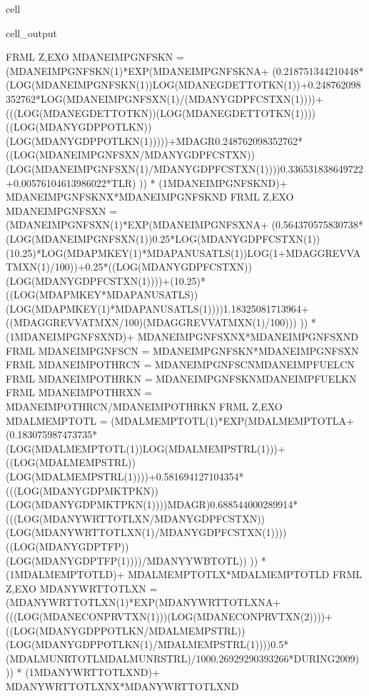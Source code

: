 \documentclass[letterpaper,10pt,english]{jupyterBook}
\begin{document}
\begin{sphinxuseclass}{cell}
\begin{sphinxVerbatimOutput}
\begin{sphinxuseclass}{cell_output}
\begin{sphinxVerbatim}[commandchars=\\\{\}]
FRML \PYGZlt{}Z,EXO\PYGZgt{} MDANEIMPGNFSKN = (MDANEIMPGNFSKN(\PYGZhy{}1)*EXP(MDANEIMPGNFSKN\PYGZus{}A+ (\PYGZhy{}0.218751344210448*(LOG(MDANEIMPGNFSKN(\PYGZhy{}1))\PYGZhy{}LOG(MDANEGDETTOTKN(\PYGZhy{}1))+0.248762098352762*LOG(MDANEIMPGNFSXN(\PYGZhy{}1)/(MDANYGDPFCSTXN(\PYGZhy{}1))))+(((LOG(MDANEGDETTOTKN))\PYGZhy{}(LOG(MDANEGDETTOTKN(\PYGZhy{}1))))\PYGZhy{}((LOG(MDANYGDPPOTLKN))\PYGZhy{}(LOG(MDANYGDPPOTLKN(\PYGZhy{}1)))))+MDAGR\PYGZhy{}0.248762098352762*((LOG(MDANEIMPGNFSXN/MDANYGDPFCSTXN))\PYGZhy{}(LOG(MDANEIMPGNFSXN(\PYGZhy{}1)/MDANYGDPFCSTXN(\PYGZhy{}1))))\PYGZhy{}0.336531838649722+0.00576104613986022*T\PYGZus{}LR) )) * (1\PYGZhy{}MDANEIMPGNFSKN\PYGZus{}D)+ MDANEIMPGNFSKN\PYGZus{}X*MDANEIMPGNFSKN\PYGZus{}D  \PYGZdl{}
FRML \PYGZlt{}Z,EXO\PYGZgt{} MDANEIMPGNFSXN = (MDANEIMPGNFSXN(\PYGZhy{}1)*EXP(MDANEIMPGNFSXN\PYGZus{}A+ (\PYGZhy{}0.564370575830738*(LOG(MDANEIMPGNFSXN(\PYGZhy{}1))\PYGZhy{}0.25*LOG(MDANYGDPFCSTXN(\PYGZhy{}1))\PYGZhy{}(1\PYGZhy{}0.25)*LOG(MDAPMKEY(\PYGZhy{}1)*MDAPANUSATLS(\PYGZhy{}1))\PYGZhy{}LOG(1+MDAGGREVVATMXN(\PYGZhy{}1)/100))+0.25*((LOG(MDANYGDPFCSTXN))\PYGZhy{}(LOG(MDANYGDPFCSTXN(\PYGZhy{}1))))+(1\PYGZhy{}0.25)*((LOG(MDAPMKEY*MDAPANUSATLS))\PYGZhy{}(LOG(MDAPMKEY(\PYGZhy{}1)*MDAPANUSATLS(\PYGZhy{}1))))\PYGZhy{}1.18325081713964+((MDAGGREVVATMXN/100)\PYGZhy{}(MDAGGREVVATMXN(\PYGZhy{}1)/100))) )) * (1\PYGZhy{}MDANEIMPGNFSXN\PYGZus{}D)+ MDANEIMPGNFSXN\PYGZus{}X*MDANEIMPGNFSXN\PYGZus{}D  \PYGZdl{}
FRML  \PYGZlt{}\PYGZgt{} MDANEIMPGNFSCN = MDANEIMPGNFSKN*MDANEIMPGNFSXN \PYGZdl{}
FRML  \PYGZlt{}\PYGZgt{} MDANEIMPOTHRCN = MDANEIMPGNFSCN\PYGZhy{}MDANEIMPFUELCN \PYGZdl{}
FRML  \PYGZlt{}\PYGZgt{} MDANEIMPOTHRKN = MDANEIMPGNFSKN\PYGZhy{}MDANEIMPFUELKN \PYGZdl{}
FRML  \PYGZlt{}\PYGZgt{} MDANEIMPOTHRXN = MDANEIMPOTHRCN/MDANEIMPOTHRKN \PYGZdl{}
FRML \PYGZlt{}Z,EXO\PYGZgt{} MDALMEMPTOTL = (MDALMEMPTOTL(\PYGZhy{}1)*EXP(MDALMEMPTOTL\PYGZus{}A+ (\PYGZhy{}0.183075987473735*(LOG(MDALMEMPTOTL(\PYGZhy{}1))\PYGZhy{}LOG(MDALMEMPSTRL(\PYGZhy{}1)))+((LOG(MDALMEMPSTRL))\PYGZhy{}(LOG(MDALMEMPSTRL(\PYGZhy{}1))))+0.581694127104354*(((LOG(MDANYGDPMKTPKN))\PYGZhy{}(LOG(MDANYGDPMKTPKN(\PYGZhy{}1))))\PYGZhy{}MDAGR)\PYGZhy{}0.688544000289914*(((LOG(MDANYWRTTOTLXN/MDANYGDPFCSTXN))\PYGZhy{}(LOG(MDANYWRTTOTLXN(\PYGZhy{}1)/MDANYGDPFCSTXN(\PYGZhy{}1))))\PYGZhy{}((LOG(MDANYGDPTFP))\PYGZhy{}(LOG(MDANYGDPTFP(\PYGZhy{}1))))/MDANYYWBTOTL\PYGZus{})) )) * (1\PYGZhy{}MDALMEMPTOTL\PYGZus{}D)+ MDALMEMPTOTL\PYGZus{}X*MDALMEMPTOTL\PYGZus{}D  \PYGZdl{}
FRML \PYGZlt{}Z,EXO\PYGZgt{} MDANYWRTTOTLXN = (MDANYWRTTOTLXN(\PYGZhy{}1)*EXP(MDANYWRTTOTLXN\PYGZus{}A+ (((LOG(MDANECONPRVTXN(\PYGZhy{}1)))\PYGZhy{}(LOG(MDANECONPRVTXN(\PYGZhy{}2))))+((LOG(MDANYGDPPOTLKN/MDALMEMPSTRL))\PYGZhy{}(LOG(MDANYGDPPOTLKN(\PYGZhy{}1)/MDALMEMPSTRL(\PYGZhy{}1))))\PYGZhy{}0.5*(MDALMUNRTOTL\PYGZus{}\PYGZhy{}MDALMUNRSTRL\PYGZus{})/100\PYGZhy{}0.26929290393266*DURING\PYGZus{}2009) )) * (1\PYGZhy{}MDANYWRTTOTLXN\PYGZus{}D)+ MDANYWRTTOTLXN\PYGZus{}X*MDANYWRTTOTLXN\PYGZus{}D  \PYGZdl{}

\end{sphinxVerbatim}
\end{sphinxuseclass}
\end{sphinxVerbatimOutput}
\end{sphinxuseclass}
\end{document}
